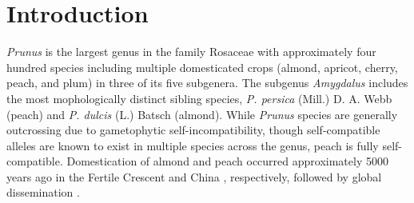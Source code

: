 \documentclass[12pt]{article}
\begin{document}
\section*{Introduction}
\emph{Prunus} is the largest genus in the family Rosaceae with approximately four hundred species including multiple domesticated crops (almond, apricot, cherry, peach, and plum) in three of its five subgenera.
%
%
%
The subgenus \emph{Amygdalus} includes the most mophologically distinct sibling species, \emph{P. persica} (Mill.) D. A. Webb (peach) and \emph{P. dulcis} (L.) Batsch (almond).
%
%
While \emph{Prunus} species are generally outcrossing due to gametophytic self-incompatibility, though self-compatible alleles are known to exist in multiple species across the genus, peach is fully self-compatible. 
%
Domestication of almond and peach occurred approximately 5000 years ago in the Fertile Crescent and China \citep{zohary2012domestication}, respectively, followed by global dissemination \citep{hedrick1917peaches, edwards1975almond, gradziel2011origin, zheng2014archaeological}.
%
%
%
\end{document}
